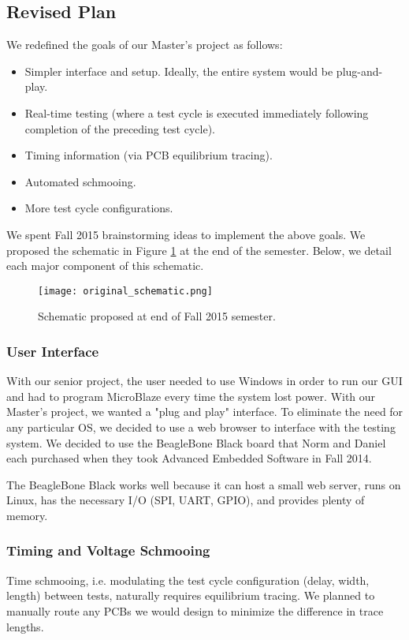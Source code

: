\subsection{Revised Plan}
We redefined the goals of our Master's project as follows: 
\begin{itemize}
\item Simpler interface and setup. Ideally, the entire system would be plug-and-play.
\item Real-time testing (where a test cycle is executed immediately following completion of the preceding test cycle).
\item Timing information (via PCB equilibrium tracing).
\item Automated schmooing.
\item More test cycle configurations.
\end{itemize}

We spent Fall 2015 brainstorming ideas to implement the above goals. We proposed the schematic in Figure \ref{fig:f15_schematic} at the end of the semester. Below, we detail each major component of this schematic.

\begin{figure}
\texttt{[image: original\_schematic.png]}
\caption{Schematic proposed at end of Fall 2015 semester.}
\label{fig:f15_schematic}
\end{figure}

\subsubsection{User Interface}
With our senior project, the user needed to use Windows in order to run our GUI and had to program MicroBlaze every time the system lost power. With our Master's project, we wanted a "plug and play" interface. To eliminate the need for any particular OS, we decided to use a web browser to interface with the testing system. We decided to use the BeagleBone Black board that Norm and Daniel each purchased when they took Advanced Embedded Software in Fall 2014.

The BeagleBone Black works well because it can host a small web server, runs on Linux, has the necessary I/O (SPI, UART, GPIO), and provides plenty of memory. 

\subsubsection{Timing and Voltage Schmooing}
Time schmooing, i.e. modulating the test cycle configuration (delay, width, length) between tests, naturally requires equilibrium tracing. We planned to manually route any PCBs we would design to minimize the difference in trace lengths.


